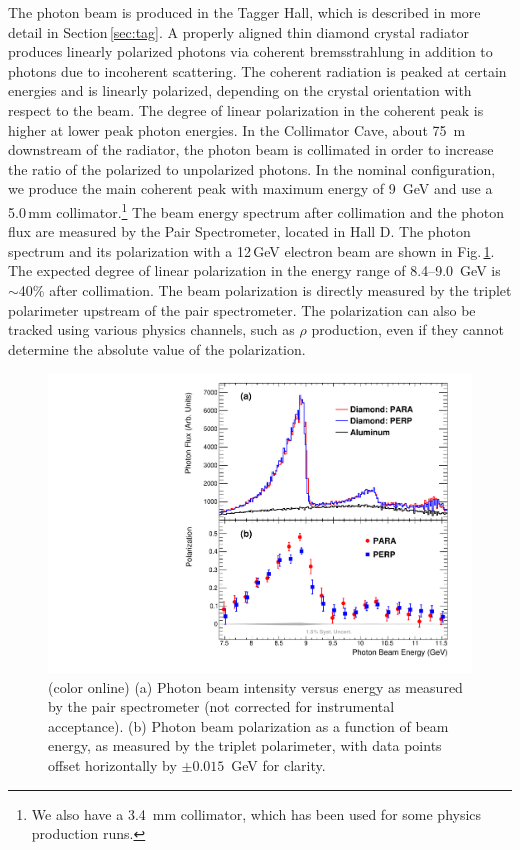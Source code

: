 The photon beam is produced in the Tagger Hall, which is described in more detail in Section\,\ref{sec:tag}.
A properly aligned thin diamond crystal radiator produces linearly polarized photons via coherent bremsstrahlung \cite{timm1969} in addition to photons due to incoherent scattering.
The coherent radiation is peaked at certain energies and is linearly polarized, depending on the crystal orientation with respect to the beam.
The degree of linear polarization in the coherent peak is higher at lower peak photon energies.
In the Collimator Cave, about 75~m downstream of the radiator, the photon beam is collimated in order to increase the ratio of the polarized to unpolarized photons.  In the nominal \GX{} configuration, we produce the main coherent peak
with maximum energy of 9~GeV and use a 5.0\,mm  collimator.\footnote{We also have a 3.4~mm collimator, which has been used for some physics production runs.}
The beam energy spectrum after collimation and the photon flux are measured by the Pair
Spectrometer, located in Hall D. The photon spectrum and its polarization with a 12\,GeV electron beam are shown in Fig.\,\ref{fig:beam:gx3102_pi0etaAsym2016_fig0_beam}.
The expected degree of linear polarization in the energy range of 8.4--9.0~GeV is $\sim$40\% after collimation. 
The beam polarization is directly measured by the triplet polarimeter upstream of the pair spectrometer. The polarization can also be tracked using various physics channels, such as $\rho$ 
production, even if they cannot determine the absolute value of the polarization. 
  
 \begin{figure}[t]
\begin{center}
 \includegraphics[clip=true,width=0.5\linewidth]{figures/gx3102_pi0etaAsym2016_fig0_beam.pdf}
\end{center}
\caption{(color online) (a) Photon beam intensity versus energy as measured by the pair spectrometer (not corrected for instrumental acceptance).  (b) Photon beam polarization as a function of beam energy, as measured by the triplet polarimeter, with data points offset horizontally by $\pm0.015$~GeV for clarity.
        }
\label{fig:beam:gx3102_pi0etaAsym2016_fig0_beam} 
\end{figure}

